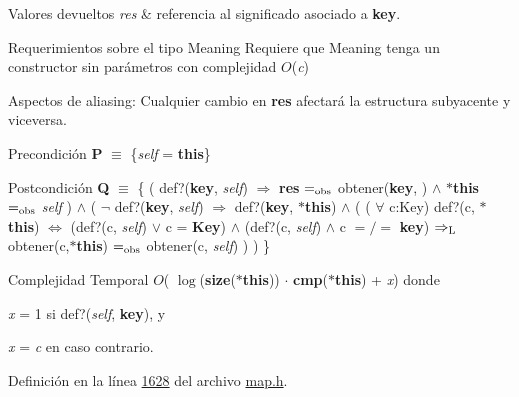 \begin{DoxyRetVals}{Valores devueltos}
{\em res} & referencia al significado asociado a {\bfseries key}.\\
\hline
\end{DoxyRetVals}
\begin{DoxyParagraph}{Requerimientos sobre el tipo Meaning}
Requiere que Meaning tenga un constructor sin parámetros con complejidad $O$({\itshape c})
\end{DoxyParagraph}
\begin{DoxyParagraph}{Aspectos de aliasing\-:}
Cualquier cambio en {\bfseries res} afectará la estructura subyacente y viceversa.
\end{DoxyParagraph}
\begin{DoxyPrecond}{Precondición}
{\bfseries P} $\equiv$ \{{\itshape self} = {\bfseries this}\} 
\end{DoxyPrecond}
\begin{DoxyPostcond}{Postcondición}
{\bfseries Q} $\equiv$ \{ ( def?({\bfseries key}, {\itshape self}) $\Rightarrow$ {\bfseries res} $=_{\rm obs}$ obtener({\bfseries key}, ) $\land$ {\bfseries $\ast$this} $=_{\rm obs}$ {\itshape self} ) $\land$ ( $\lnot$ def?({\bfseries key}, {\itshape self}) $\Rightarrow$ def?({\bfseries key}, {\bfseries $\ast$this}) $\land$ ( ( $\forall$ c\-:Key) def?(c, {\bfseries $\ast$this}) $\Leftrightarrow$ (def?(c, {\itshape self}) $\lor$ c = {\bfseries Key}) $\land$ (def?(c, {\itshape self}) $\land$ c $=/=$ {\bfseries key}) $\Rightarrow_{\rm L}$ obtener(c,{\bfseries $\ast$this}) $=_{\rm obs}$ obtener(c, {\itshape self}) ) ) \} 
\begin{DoxyDescription}
\item[Complejidad Temporal]$O$( $\log$({\bfseries size}({\bfseries $\ast$this})) $\cdot$ {\bfseries cmp}({\bfseries $\ast$this}) + {\itshape x}) donde
\begin{DoxyItemize}
\item {\itshape x} = 1 si def?({\itshape self}, {\bfseries key}), y
\item {\itshape x} = {\itshape c} en caso contrario.
\end{DoxyItemize}
\end{DoxyDescription}
\end{DoxyPostcond}


Definición en la línea \hyperlink{map_8h_source_l01628}{1628} del archivo \hyperlink{map_8h_source}{map.\-h}.

